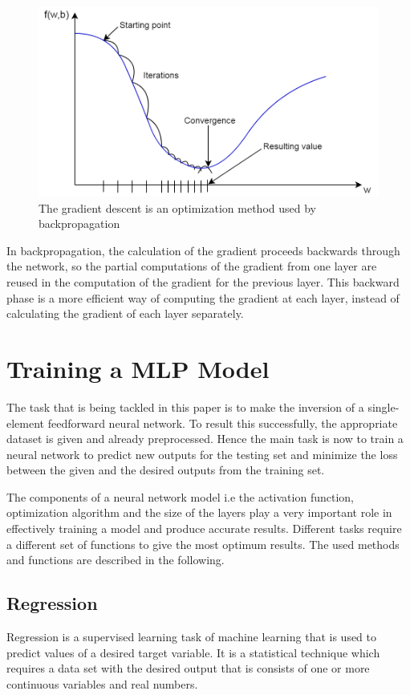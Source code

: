 \begin{figure}[h]
	\centering
	\includegraphics[height=0.35\linewidth]{./figures/gradient}
	\caption{The gradient descent is an optimization method used by backpropagation}
	\label{fig:gradient}
\end{figure}

In backpropagation, the calculation of the gradient proceeds backwards through the network, so the partial computations of the gradient from one layer are reused in the computation of the gradient for the previous layer. This backward phase is a more efficient way of computing the gradient at each layer, instead of calculating the gradient of each layer separately.



\section{Training a MLP Model}

The task that is being tackled in this paper is to make the inversion of a single-element feedforward neural network. To result this successfully, the appropriate dataset is given and already preprocessed. Hence the main task is now to train a neural network to predict new outputs for the testing set and minimize the loss between the given and the desired outputs from the training set. \medskip

The components of a neural network model i.e the activation function, optimization algorithm and the size of the layers play a very important role in effectively training a model and produce accurate results. Different tasks require a different set of functions to give the most optimum results. The used methods and functions are described in the following.


\subsection{Regression}

Regression is a supervised learning task of machine learning that is used to predict values of a desired target variable. It is a statistical technique which requires a data set with the desired output that is consists of one or more continuous variables and real numbers.\smallskip

